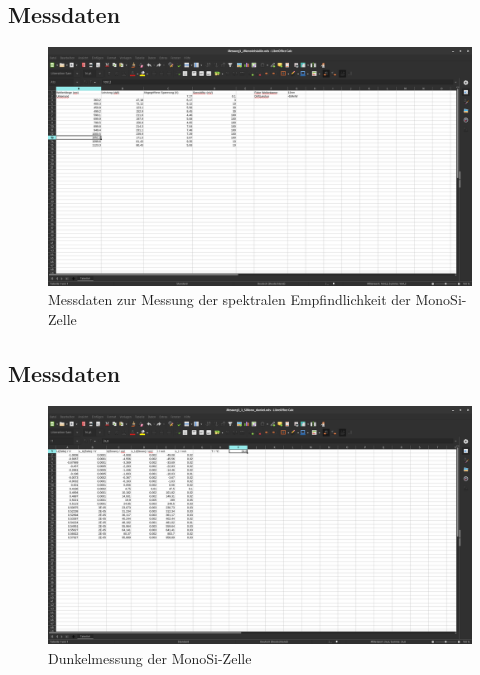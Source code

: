\clearpage
\subsection{Messdaten}
\begin{figure}[h]
    \captionsetup{justification=centering,margin=2cm}
    \centering
    \includegraphics[angle = 90, width = 12cm]{Bilder/Daten/MessunngMonoSI.png}
    \caption{Messdaten zur Messung der spektralen Empfindlichkeit der MonoSi-Zelle}
\end{figure}

\subsection{Messdaten}
\begin{figure}[h]
    \captionsetup{justification=centering,margin=2cm}
    \centering
    \includegraphics[angle = 90, width = 12cm]{Bilder/Daten/MessunngMonoSiDunkel.png}
    \caption{Dunkelmessung der MonoSi-Zelle}
\end{figure}

